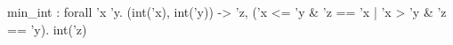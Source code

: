 min_int : forall 'x 'y. (int('x), int('y)) -> {'z, ('x <= 'y & 'z == 'x | 'x > 'y & 'z == 'y). int('z)}